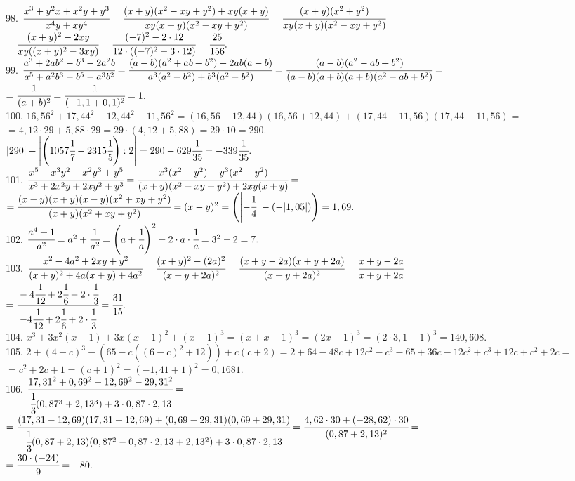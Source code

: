 98. $\cfrac{x^3+y^2x+x^2y+y^3}{x^4y+xy^4}=\cfrac{(x+y)(x^2-xy+y^2)+xy(x+y)}{xy(x+y)(x^2-xy+y^2)}=
\cfrac{(x+y)(x^2+y^2)}{xy(x+y)(x^2-xy+y^2)}=$\\$=\cfrac{(x+y)^2-2xy}{xy((x+y)^2-3xy)}=\cfrac{(-7)^2-2\cdot12}{12\cdot((-7)^2-3\cdot12)}=\cfrac{25}{156}.$\\
99. $\cfrac{a^3+2ab^2-b^3-2a^2b}{a^5+a^2b^3-b^5-a^3b^2}=\cfrac{(a-b)(a^2+ab+b^2)-2ab(a-b)}{a^3(a^2-b^2)+b^3(a^2-b^2)}=
\cfrac{(a-b)(a^2-ab+b^2)}{(a-b)(a+b)(a+b)(a^2-ab+b^2)}=$\\$=\cfrac{1}{(a+b)^2}=\cfrac{1}{(-1,1+0,1)^2}=1.$\\
100. $16,56^2+17,44^2-12,44^2-11,56^2=(16,56-12,44)(16,56+12,44)+(17,44-11,56)(17,44+11,56)=$\\$=4,12\cdot29+5,88\cdot29=29\cdot(4,12+5,88)=29\cdot10=290.$\\
$|290|-\left |\left(1057\cfrac{1}{7}-2315\cfrac{1}{5}\right):2\right |=290-629\cfrac{1}{35}=-339\cfrac{1}{35}.$\\
101. $\cfrac{x^5-x^3y^2-x^2y^3+y^5}{x^3+2x^2y+2xy^2+y^3}=\cfrac{x^3(x^2-y^2)-y^3(x^2-y^2)}{(x+y)(x^2-xy+y^2)+2xy(x+y)}=$\\$=
\cfrac{(x-y)(x+y)(x-y)(x^2+xy+y^2)}{(x+y)(x^2+xy+y^2)}=(x-y)^2=\left(\left|-\cfrac{1}{4}\right|-(-|1,05|)\right)=1,69.$\\
102. $\cfrac{a^4+1}{a^2}=a^2+\cfrac{1}{a^2}=\left(a+\cfrac{1}{a}\right)^2-2\cdot a\cdot\cfrac{1}{a}=3^2-2=7.$\\
103. $\cfrac{x^2-4a^2+2xy+y^2}{(x+y)^2+4a(x+y)+4a^2}=\cfrac{(x+y)^2-(2a)^2}{(x+y+2a)^2}=\cfrac{(x+y-2a)(x+y+2a)}{(x+y+2a)^2}=\cfrac{x+y-2a}{x+y+2a}=$\\$=
\cfrac{-4\cfrac{1}{12}+2\cfrac{1}{6}-2\cdot\cfrac{1}{3}}{-4\cfrac{1}{12}+2\cfrac{1}{6}+2\cdot\cfrac{1}{3}}=\cfrac{31}{15}.$\\
104. $x^3+3x^2(x-1)+3x(x-1)^2+(x-1)^3=(x+x-1)^3=(2x-1)^3=(2\cdot3,1-1)^3=140,608.$\\
105. $2+(4-c)^3-(65-c((6-c)^2+12))+c(c+2)=2+64-48c+12c^2-c^3-65+36c-12c^2+c^3+12c+c^2+2c=$\\$=c^2+2c+1=(c+1)^2=(-1,41+1)^2=0,1681.$\\
106. $\cfrac{17,31^2+0,69^2-12,69^2-29,31^2}{\cfrac{1}{3}(0,87^3+2,13^3)+3\cdot0,87\cdot2,13}=$\\$=\cfrac{(17,31-12,69)(17,31+12,69)+(0,69-29,31)(0,69+29,31)}{\cfrac{1}{3}(0,87+2,13)(0,87^2-0,87\cdot2,13+2,13^2)+3\cdot0,87\cdot2,13}=
\cfrac{4,62\cdot30+(-28,62)\cdot30}{(0,87+2,13)^2}=$\\$=\cfrac{30\cdot(-24)}{9}=-80.$\\
